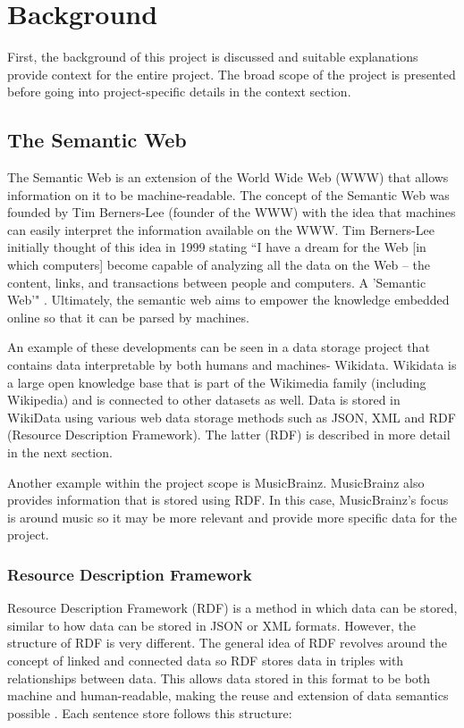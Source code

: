 \usetikzlibrary {arrows}
\usetikzlibrary {shapes.geometric}
\usetikzlibrary {patterns}

\chapter{Background}
First, the background of this project is discussed and suitable explanations provide context for the entire project. The broad scope of the project is presented before going into project-specific details in the context section.

\section{The Semantic Web}
\hspace*{0.5cm} The Semantic Web is an extension of the World Wide Web (WWW) that allows information on it to be machine-readable. \cite{semanticweb} The concept of the Semantic Web was founded by Tim Berners-Lee (founder of the WWW) with the idea that machines can easily interpret the information available on the WWW. Tim Berners-Lee initially thought of this idea in 1999 stating ``I have a dream for the Web [in which computers] become capable of analyzing all the data on the Web – the content, links, and transactions between people and computers. A 'Semantic Web'" \cite{berners-TBLBook}. Ultimately, the semantic web aims to empower the knowledge embedded online so that it can be parsed by machines. \cite{semanticweb} 

An example of these developments can be seen in a data storage project that contains data interpretable by both humans and machines- Wikidata. Wikidata is a large open knowledge base that is part of the Wikimedia family (including Wikipedia) and is connected to other datasets as well. \cite{wikidata} Data is stored in WikiData using various web data storage methods such as JSON, XML and RDF (Resource Description Framework). The latter (RDF) is described in more detail in the next section.  

Another example within the project scope is MusicBrainz. MusicBrainz also provides information that is stored using RDF. \cite{musicbrainz} In this case, MusicBrainz's focus is around music so it may be more relevant and provide more specific data for the project.  

\subsection{Resource Description Framework}
\hspace*{0.5cm} Resource Description Framework (RDF) is a method in which data can be stored, similar to how data can be stored in JSON or XML formats. However, the structure of RDF is very different. The general idea of RDF revolves around the concept of linked and connected data so RDF stores data in triples with relationships between data. This allows data stored in this format to be both machine and human-readable, making the reuse and extension of data semantics possible \cite{rdf}. Each sentence store follows this structure: 

